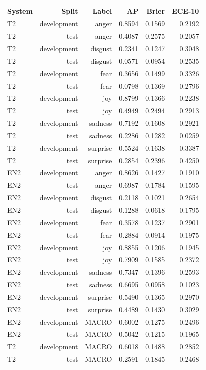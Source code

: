 \begin{tabular}{lrrrrr}
\toprule
System & Split & Label & AP & Brier & ECE-10 \\
\midrule
T2 & development & anger & 0.8594 & 0.1569 & 0.2192 \\
T2 & test & anger & 0.4087 & 0.2575 & 0.2057 \\
T2 & development & disgust & 0.2341 & 0.1247 & 0.3048 \\
T2 & test & disgust & 0.0571 & 0.0954 & 0.2535 \\
T2 & development & fear & 0.3656 & 0.1499 & 0.3326 \\
T2 & test & fear & 0.0798 & 0.1369 & 0.2796 \\
T2 & development & joy & 0.8799 & 0.1366 & 0.2238 \\
T2 & test & joy & 0.4949 & 0.2494 & 0.2913 \\
T2 & development & sadness & 0.7192 & 0.1608 & 0.2921 \\
T2 & test & sadness & 0.2286 & 0.1282 & 0.0259 \\
T2 & development & surprise & 0.5524 & 0.1638 & 0.3387 \\
T2 & test & surprise & 0.2854 & 0.2396 & 0.4250 \\
EN2 & development & anger & 0.8626 & 0.1427 & 0.1910 \\
EN2 & test & anger & 0.6987 & 0.1784 & 0.1595 \\
EN2 & development & disgust & 0.2118 & 0.1021 & 0.2654 \\
EN2 & test & disgust & 0.1288 & 0.0618 & 0.1795 \\
EN2 & development & fear & 0.3578 & 0.1237 & 0.2901 \\
EN2 & test & fear & 0.2884 & 0.0914 & 0.1975 \\
EN2 & development & joy & 0.8855 & 0.1206 & 0.1945 \\
EN2 & test & joy & 0.7909 & 0.1585 & 0.2372 \\
EN2 & development & sadness & 0.7347 & 0.1396 & 0.2593 \\
EN2 & test & sadness & 0.6695 & 0.0958 & 0.1023 \\
EN2 & development & surprise & 0.5490 & 0.1365 & 0.2970 \\
EN2 & test & surprise & 0.4489 & 0.1430 & 0.3029 \\
EN2 & development & MACRO & 0.6002 & 0.1275 & 0.2496 \\
EN2 & test & MACRO & 0.5042 & 0.1215 & 0.1965 \\
T2 & development & MACRO & 0.6018 & 0.1488 & 0.2852 \\
T2 & test & MACRO & 0.2591 & 0.1845 & 0.2468 \\
\bottomrule
\end{tabular}
